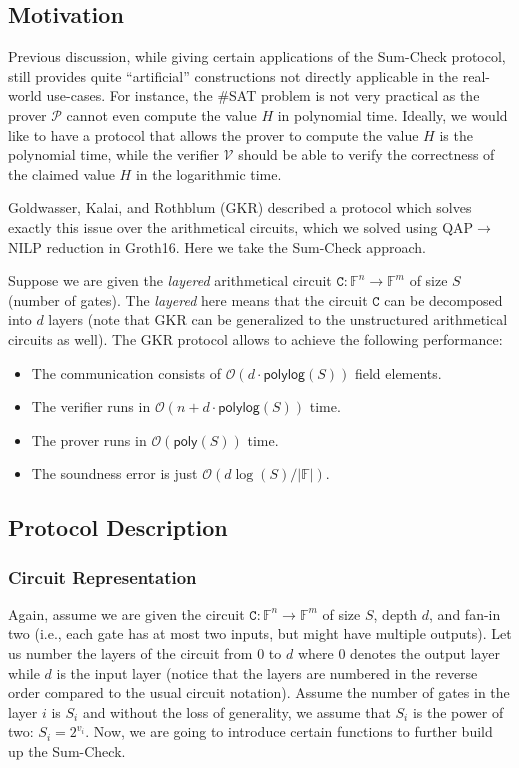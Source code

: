 \documentclass[../../book.tex]{subfiles}
\begin{document}
\subsection{Motivation}
Previous discussion, while giving certain applications of the Sum-Check
protocol, still provides quite ``artificial'' constructions not 
directly applicable in the real-world use-cases. For instance, 
the \#SAT problem is not very practical as the prover $\mathcal{P}$
cannot even compute the value $H$ in polynomial time. Ideally,
we would like to have a protocol that allows the prover to compute
the value $H$ is the polynomial time, while the verifier $\mathcal{V}$
should be able to verify the correctness of the claimed value
$H$ in the logarithmic time. 

Goldwasser, Kalai, and Rothblum (GKR) \cite{gkr} described a protocol which
solves exactly this issue over the arithmetical circuits, which
we solved using QAP$\to$NILP reduction in Groth16. Here we take
the Sum-Check approach.

Suppose we are given the \textit{layered} arithmetical
circuit $\mathtt{C}: \mathbb{F}^n \to \mathbb{F}^m$ of size 
$S$ (number of gates). The \textit{layered} here means 
that the circuit $\mathtt{C}$ can be decomposed into $d$ 
layers (note that GKR can be generalized to the unstructured 
arithmetical circuits as well). The GKR protocol allows 
to achieve the following performance:
\begin{itemize}
    \item The communication consists of $\mathcal{O}(d \cdot \mathsf{polylog}(S))$ field elements.
    \item The verifier runs in $\mathcal{O}(n + d \cdot \mathsf{polylog}(S))$ time.
    \item The prover runs in $\mathcal{O}(\mathsf{poly}(S))$ time.
    \item The soundness error is just $\mathcal{O}(d \log(S) / |\mathbb{F}|)$.
\end{itemize}

\subsection{Protocol Description}

\subsubsection{Circuit Representation}

Again, assume we are given the circuit $\mathtt{C}: \mathbb{F}^n \to
\mathbb{F}^m$ of size $S$, depth $d$, and fan-in two (i.e., each gate has at
most two inputs, but might have multiple outputs). Let us number the layers of
the circuit from $0$ to $d$ where $0$ denotes the output layer while $d$ is the
input layer (notice that the layers are numbered in the reverse order compared
to the usual circuit notation). Assume the number of gates in the layer $i$ is
$S_i$ and without the loss of generality, we assume that $S_i$ is the power of
two: $S_i = 2^{v_i}$. Now, we are going to introduce certain functions 
to further build up the Sum-Check.
\end{document}
